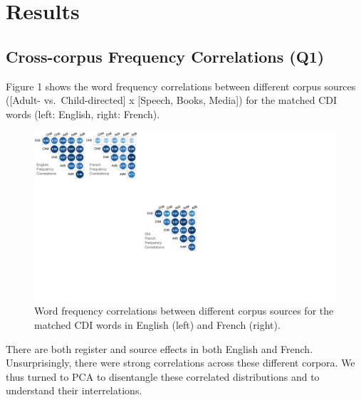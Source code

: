 \documentclass[10pt, letterpaper]{article}
\newenvironment{CodeChunk}{}{}
\begin{document}
\hypertarget{results}{%
\section{Results}\label{results}}

\hypertarget{cross-corpus-frequency-correlations-q1}{%
\subsection{Cross-corpus Frequency Correlations
(Q1)}\label{cross-corpus-frequency-correlations-q1}}

Figure 1 shows the word frequency correlations between different corpus
sources ({[}Adult- vs.~Child-directed{]} x {[}Speech, Books, Media{]})
for the matched CDI words (left: English, right: French).

\begin{CodeChunk}
\begin{figure}[H]

{\centering \includegraphics[width=\linewidth]{figs/corpus_freq_cors_hor} 

}

\caption[Word frequency correlations between different corpus sources for the matched CDI words in English (left) and French (right)]{Word frequency correlations between different corpus sources for the matched CDI words in English (left) and French (right).}\label{fig:fig1}
\end{figure}
\end{CodeChunk}

There are both register and source effects in both English and French.
Unsurprisingly, there were strong correlations across these different
corpora. We thus turned to PCA to disentangle these correlated
distributions and to understand their interrelations.
\end{document}
